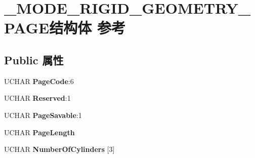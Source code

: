 \hypertarget{struct___m_o_d_e___r_i_g_i_d___g_e_o_m_e_t_r_y___p_a_g_e}{}\section{\+\_\+\+M\+O\+D\+E\+\_\+\+R\+I\+G\+I\+D\+\_\+\+G\+E\+O\+M\+E\+T\+R\+Y\+\_\+\+P\+A\+G\+E结构体 参考}
\label{struct___m_o_d_e___r_i_g_i_d___g_e_o_m_e_t_r_y___p_a_g_e}
\subsection*{Public 属性}
\begin{DoxyCompactItemize}
\item 
\mbox{\label{struct___m_o_d_e___r_i_g_i_d___g_e_o_m_e_t_r_y___p_a_g_e_a26b9d0599a9d77d07271e5ebc2686152}} 
U\+C\+H\+AR {\bfseries Page\+Code}\+:6
\item 
\mbox{\label{struct___m_o_d_e___r_i_g_i_d___g_e_o_m_e_t_r_y___p_a_g_e_a1e2680fdf30ed7e0aef26d64683f517f}} 
U\+C\+H\+AR {\bfseries Reserved}\+:1
\item 
\mbox{\label{struct___m_o_d_e___r_i_g_i_d___g_e_o_m_e_t_r_y___p_a_g_e_a98f7ed227da5530ab6e1f95464de5c81}} 
U\+C\+H\+AR {\bfseries Page\+Savable}\+:1
\item 
\mbox{\label{struct___m_o_d_e___r_i_g_i_d___g_e_o_m_e_t_r_y___p_a_g_e_a5116d7891850dd19d37d9f0c44d8273a}} 
U\+C\+H\+AR {\bfseries Page\+Length}
\item 
\mbox{\label{struct___m_o_d_e___r_i_g_i_d___g_e_o_m_e_t_r_y___p_a_g_e_a0b37149870d38b97a60d87cb9a3eb9d4}} 
U\+C\+H\+AR {\bfseries Number\+Of\+Cylinders} \mbox{[}3\mbox{]}
\item 
\mbox{\label{struct___m_o_d_e___r_i_g_i_d___g_e_o_m_e_t_r_y___p_a_g_e_a140159a121e384619f62e5f24325e7f3}} 

\end{DoxyCompactItemize}
